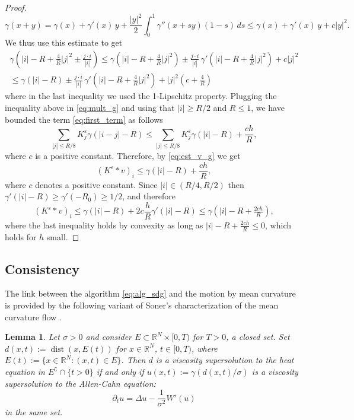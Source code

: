 \documentclass[10pt]{amsart}
\theoremstyle{plain}
\newtheorem{lemma}[theorem]{Lemma}
\theoremstyle{definition}
\newcommand{\R}{\mathbb{R}}
\newcommand{\g}{\gamma}
\newcommand{\comp}[1]{{#1}^\complement}
\DeclareMathOperator{\dist}{dist}
\newcommand{\e}{\varepsilon}
\numberwithin{equation}{section}
\begin{document}
\begin{proof}
\[
    \g( x+y)  = \g(x) +\g'(x)\, y + \frac{|y|^2}2 \int_0^1\g''(x +  sy)(1-s)\,ds\le \g(x) +\g'(x)\, y + c|y|^2.
\]
We  thus use this estimate to get  
\begin{multline*}
    \g(|i|-R + \tfrac{4}{R} |j|^2 \pm \tfrac{j\cdot i}{|i|}  ) \le  \g(|i|-R+ \tfrac{4}{R} |j|^2) \pm \frac{j\cdot i}{|i|}\, \g'(|i|-R+ \tfrac{4}{R} |j|^2) + c |j|^2\\
    \le    \g(|i|-R  ) \pm \frac{j\cdot i}{|i|} \, \g'(|i|-R+ \tfrac{4}{R} |j|^2) + |j|^2 (c+\tfrac 4{R})
\end{multline*}
where in the last inequality we used the 1-Lipschitz property. Plugging the inequality above in \eqref{eq:mult_g} and using that   $|i|\ge R/2$ and $R\le 1$, we have bounded the term \eqref{eq:first_term} as follows 
\[
\sum_{|j|\le R/8} K^\e_j \g(|i-j|-R)\le \sum_{|j|\le R/8} K^\e_j \g(|i|-R) + \frac{ch}R,
\]
where $c$ is a positive constant.  
Therefore, by \eqref{eq:est_v_g} we get 
\[
(K^\e\ast v)_i \le \g(|i|-R) +\frac{ch}R,
\]
where $c$ denotes a positive constant.  Since $|i|\in(R/4,R/2)$ then $\g'(|i|-R)\ge \g'(-R_0)\ge 1/2$, and therefore 
\[
(K^\e\ast v)_i \le \g(|i|-R) + 2c \frac{h}R\g'(|i|-R)\le \g(|i|-R+ \tfrac{2ch}R),
\]
where the last inequality holds by convexity as long as  $  |i|-R+\tfrac{2ch}R\le 0$, which holds for $h$ small.
\end{proof}



 \subsection{Consistency }
 The link between the algorithm \eqref{eq:alg_sdg} and the motion by mean curvature is provided by   the following variant of  Soner's characterization of  the mean curvature flow  \cite{Soner93}.
\begin{lemma}\label{lem:AC}
Let $\sigma>0$ and consider $E\subset \R^N\times [0,T)$ for  $T>0$, a closed set. Set $d(x,t):= \dist(x,E(t))$ for $x\in \R^N$, $t\in [0,T)$,
where $E(t) := \{x\in \R^N: (x,t)\in E\}$.
Then
  $d$ is  a viscosity supersolution to the heat equation
      in $\comp{E} \cap \{t>0\}$
      if and only if $u(x,t) := \gamma(d(x,t)/\sigma)$ is a
  viscosity supersolution to
  the Allen-Cahn equation:
  \begin{equation}\label{eq:AC}
    \partial_t u = \Delta u - \frac{1}{\sigma^2} W'(u)
  \end{equation}
  in  the same set.
\end{lemma}
\end{document}
